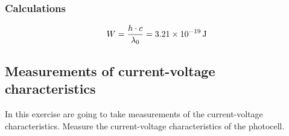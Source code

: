 \subsubsection*{Calculations }

\begin{equation}
	W = \frac{h\cdot c}{\lambda_0} = \SI{3.21E-19 }{\joule}
\end{equation}






\subsection{Measurements of current-voltage characteristics}

In this exercise are going to take measurements of the current-voltage characteristics.
Measure the current-voltage characteristics of the photocell.

